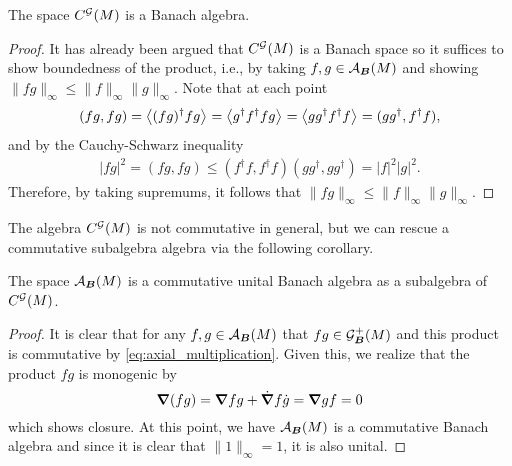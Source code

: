 \begin{proposition}
The space $C^{\mathcal{G}}(M)$ is a Banach algebra. 
\end{proposition}
\begin{proof}
It has already been argued that $C^{\mathcal{G}}(M)$ is a Banach space so it suffices to show boundedness of the product, i.e., by taking $f,g \in \mathcal{A}_{\boldsymbol{B}}(M)$ and showing $\|fg\|_\infty\leq \|f\|_\infty\|g\|_\infty$. Note that at each point
\begin{align}
(fg,fg) = \left\langle(fg)^\dagger fg\right\rangle_{}=\left\langle g^\dagger f^\dagger f g\right\rangle_{} = \left\langle gg^\dagger f^\dagger f\right\rangle_{} = (gg^\dagger, f^\dagger f),
\end{align}
and by the Cauchy-Schwarz inequality 
\begin{align}
|fg|^2 = (fg,fg) \leq (f^\dagger f, f^\dagger f) (gg^\dagger,gg^\dagger) = |f|^2 |g|^2.
\end{align}
Therefore, by taking supremums, it follows that $\|fg\|_\infty\leq \|f\|_\infty\|g\|_\infty$. 
\end{proof}
The algebra $C^{\mathcal{G}}(M)$ is not commutative in general, but we can rescue a commutative subalgebra algebra via the following corollary.
\begin{corollary}
The space $\mathcal{A}_{\boldsymbol{B}}(M)$ is a commutative unital Banach algebra as a subalgebra of $C^{\mathcal{G}}(M)$. 
\end{corollary}
\begin{proof}
It is clear that for any $f,g \in \mathcal{A}_{\boldsymbol{B}}(M)$ that $fg \in \mathcal{G}_{\boldsymbol{B}}^+(M)$ and this product is commutative by \cref{eq:axial_multiplication}. Given this, we realize that the product $fg$ is monogenic by
\begin{equation}
\boldsymbol{\nabla}(fg) = \boldsymbol{\nabla} fg+\dot{\boldsymbol{\nabla}}f \dot{g} = \boldsymbol{\nabla} g f = 0
\end{equation}
which shows closure. At this point, we have $\mathcal{A}_{\boldsymbol{B}}(M)$ is a commutative Banach algebra and since it is clear that $\|1\|_\infty=1$, it is also unital. 
\end{proof}

